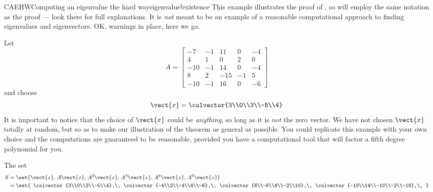 \begin{example}{CAEHW}{Computing an eigenvalue the hard way}{eigenvalue!existence}
%
This example illustrates the proof of , so will employ the same notation as the proof --- look there for full explanations.  It is {\em not} meant to be an example of a reasonable computational approach to finding eigenvalues and eigenvectors.  OK, warnings in place, here we go.\par
%
Let
%
\begin{equation*}
A=\begin{bmatrix}
-7 & -1 & 11 & 0 & -4\\ 
4 & 1 & 0 & 2 & 0\\ 
-10 & -1 & 14 & 0 & -4\\ 
8 & 2 & -15 & -1 & 5\\ 
-10 & -1 & 16 & 0 & -6
\end{bmatrix}
\end{equation*}
%
and choose
%
\begin{equation*}
\vect{x}=\colvector{3\\0\\3\\-5\\4}
\end{equation*}
%
It is important to notice that the choice of $\vect{x}$ could be {\em anything}, so long as it is {\em not} the zero vector.  We have not chosen $\vect{x}$ totally at random, but so as to make our illustration of the theorem as general as possible.  You could replicate this example with your own choice and the computations are guaranteed to be reasonable, provided you have a computational tool that will factor a fifth degree polynomial for you.\par
%
The set
%
\begin{align*}
S&=\set{\vect{x},\,A\vect{x},\,A^2\vect{x},\,A^3\vect{x},\,A^4\vect{x},\,A^5\vect{x}}\\
&=
\set{
\colvector{3\\0\\3\\-5\\4},\,
\colvector{-4\\2\\-4\\4\\-6},\,
\colvector{6\\-6\\6\\-2\\10},\,
\colvector{-10\\14\\-10\\-2\\-18},\,
}
\end{align*}
\end{example}
